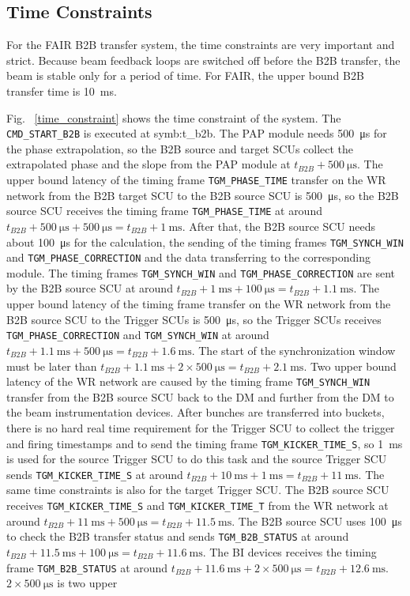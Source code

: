 \subsection{Time Constraints}
For the FAIR B2B transfer system, the time constraints are very important and strict. Because beam feedback loops are switched off before the B2B transfer, the beam is stable only for a period of time. For FAIR, the upper bound B2B transfer time is \SI{10}{\ms}. 

Fig. ~\ref{time_constraint} shows the time constraint of the system. The \verb|CMD_START_B2B| is executed at \gls{symb:t_b2b}. The PAP module needs \SI{500}{\us} for the phase extrapolation, so the B2B source and target SCUs collect the extrapolated phase and the slope from the PAP module at $t_\mathit{B2B} + \SI{500}{\us}$. The upper bound latency of the timing frame \verb|TGM_PHASE_TIME| transfer on the WR network from the B2B target SCU to the B2B source SCU is \SI{500}{\us}, so the B2B source SCU receives the timing frame \verb|TGM_PHASE_TIME| at around $t_\mathit{B2B} + \SI{500}{\us} + \SI{500}{\us} = t_\mathit{B2B} + \SI{1}{\ms}$. After that, the B2B source SCU needs about \SI{100}{\us} for the calculation, the sending of the timing frames \verb|TGM_SYNCH_WIN| and \verb|TGM_PHASE_CORRECTION| and the data transferring to the corresponding module. The timing frames \verb|TGM_SYNCH_WIN| and \verb|TGM_PHASE_CORRECTION| are sent by the B2B source SCU at around $t_\mathit{B2B} + \SI{1}{\ms} + \SI{100}{\us} = t_\mathit{B2B} + \SI{1.1}{\ms}$. The upper bound latency of the timing frame transfer on the WR network from the B2B source SCU to the Trigger SCUs is \SI{500}{\us}, so the Trigger SCUs receives \verb|TGM_PHASE_CORRECTION| and \verb|TGM_SYNCH_WIN| at around $t_\mathit{B2B} + \SI{1.1}{\ms} + \SI{500}{\us} = t_\mathit{B2B} + \SI{1.6}{\ms}$. The start of the synchronization window must be later than $t_\mathit{B2B} + \SI{1.1}{\ms} + 2\times\SI{500}{\us} = t_\mathit{B2B} + \SI{2.1}{\ms}$. Two upper bound latency of the WR network are caused by the timing frame \verb|TGM_SYNCH_WIN| transfer from the B2B source SCU back to the DM and further from the DM to the beam instrumentation devices. After bunches are transferred into buckets, there is no hard real time requirement for the Trigger SCU to collect the trigger and firing timestamps and to send the timing frame \verb|TGM_KICKER_TIME_S|, so \SI{1}{\ms} is used for the source Trigger SCU to do this task and the source Trigger SCU sends \verb|TGM_KICKER_TIME_S| at around $t_\mathit{B2B} + \SI{10}{\ms} + \SI{1}{\ms} = t_\mathit{B2B} + \SI{11}{\ms}$. The same time constraints is also for the target Trigger SCU. The B2B source SCU receives \verb|TGM_KICKER_TIME_S| and \verb|TGM_KICKER_TIME_T| from the WR network at around $t_\mathit{B2B} + \SI{11}{\ms} + \SI{500}{\us} = t_\mathit{B2B} + \SI{11.5}{\ms}$. The B2B source SCU uses \SI{100}{\us} to check the B2B transfer status and sends \verb|TGM_B2B_STATUS| at around $t_\mathit{B2B} + \SI{11.5}{\ms} + \SI{100}{\us} = t_\mathit{B2B} + \SI{11.6}{\ms}$. The BI devices receives the timing frame \verb|TGM_B2B_STATUS| at around $t_\mathit{B2B} + \SI{11.6}{\ms} + 2\times\SI{500}{\us} = t_\mathit{B2B} + \SI{12.6}{\ms}$. $2\times\SI{500}{\us}$ is two upper 
